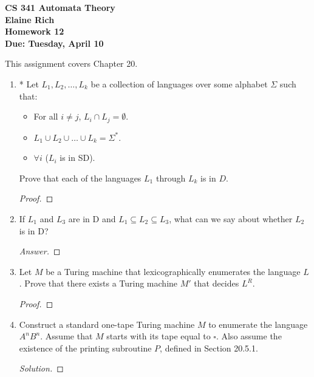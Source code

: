 \documentclass[10pt]{article}
\begin{document}
\begin{center}
\textbf{
CS 341 Automata Theory \\
Elaine Rich \\
Homework 12 \\
Due: Tuesday, April 10}\\
\end{center}
\noindent
This assignment covers Chapter 20.\\

\begin{enumerate}[1)]


\item
* Let $L_1, L_2, \ldots , L_k$ be a collection of languages over some alphabet $\Sigma$ such that:
\begin{itemize}
\item
For all $i \neq j$, $L_i \cap L_j = \emptyset$.
\item
$L_1 \cup L_2 \cup \dots \cup L_k = \Sigma ^*$.
\item
$\forall i$ ($L_i$ is in SD).
\end{itemize}
Prove that each of the languages $L_1$ through $L_k$ is in $D$.
\begin{proof}[Proof]
\end{proof}


\item
If $L_1$ and $L_3$ are in D and $L_1 \subseteq L_2 \subseteq L_3$, what can we say about whether $L_2$ is in D?
\begin{proof}[Answer]
\end{proof}


\item
Let $M$ be a Turing machine that lexicographically enumerates the language $L$. Prove that there exists a Turing
machine $M'$ that decides $L^R$.
\begin{proof}[Proof]
\end{proof}



\item
Construct a standard one-tape Turing machine $M$ to enumerate the language $A^nB^n$. Assume that $M$ starts with
its tape equal to $\square$. Also assume the existence of the printing subroutine $P$, defined in Section 20.5.1.
\begin{proof}[Solution]
\end{proof}



\end{enumerate}
\end{document}
